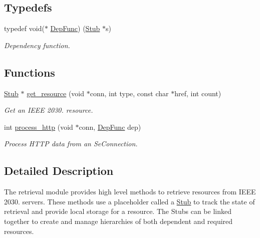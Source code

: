 \subsection*{Typedefs}
\begin{DoxyCompactItemize}
\item 
\mbox{\label{group__retrieval_ga6b78d0ec32d2700719ed6a675fd929eb}} 
typedef void($\ast$ \hyperlink{group__retrieval_ga6b78d0ec32d2700719ed6a675fd929eb}{Dep\+Func}) (\hyperlink{structStub}{Stub} $\ast$s)
\begin{DoxyCompactList}\small\item\em Dependency function. \end{DoxyCompactList}\end{DoxyCompactItemize}
\subsection*{Functions}
\begin{DoxyCompactItemize}
\item 
\hyperlink{structStub}{Stub} $\ast$ \hyperlink{group__retrieval_gaf9f86c838708d01c95a1f4f4c7c69aa1}{get\+\_\+resource} (void $\ast$conn, int type, const char $\ast$href, int count)
\begin{DoxyCompactList}\small\item\em Get an I\+E\+EE 2030. resource. \end{DoxyCompactList}\item 
int \hyperlink{group__retrieval_ga0466059a942d7af750c786d02711ca65}{process\+\_\+http} (void $\ast$conn, \hyperlink{group__retrieval_ga6b78d0ec32d2700719ed6a675fd929eb}{Dep\+Func} dep)
\begin{DoxyCompactList}\small\item\em Process H\+T\+TP data from an Se\+Connection. \end{DoxyCompactList}\end{DoxyCompactItemize}


\subsection{Detailed Description}
The retrieval module provides high level methods to retrieve resources from I\+E\+EE 2030. servers. These methods use a placeholder called a \hyperlink{structStub}{Stub} to track the state of retrieval and provide local storage for a resource. The Stubs can be linked together to create and manage hierarchies of both dependent and required resources.

